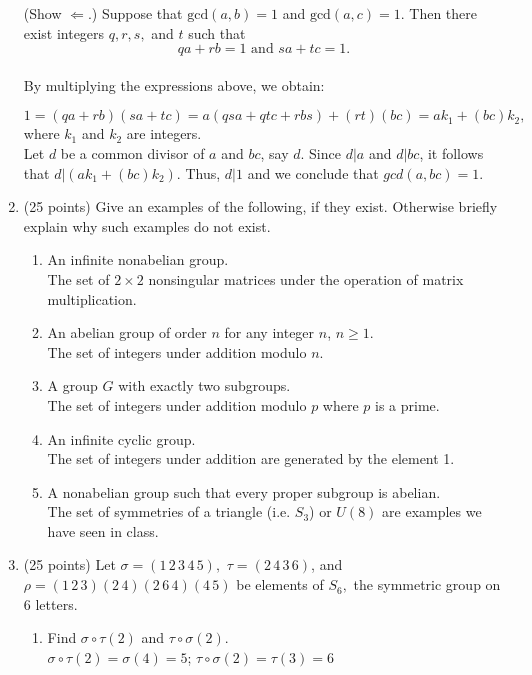 \documentclass[12pt]{article}
\begin{document}
\begin{enumerate}
(Show $\Longleftarrow$.) Suppose that $\text{gcd}(a,b)=1$ and $\text{gcd}(a,c )=1.$ Then there exist integers $q,r,s,$ and $t$ such that 
$$qa+rb=1 \text{  and  } sa+tc=1.$$\\

By multiplying the expressions above, we obtain:

$$1=(qa+rb)(sa+tc)=a(qsa+qtc+rbs)+(rt)(bc)=ak_1+(bc)k_2,$$
where $k_1$ and $k_2$ are integers. \\

Let $d$ be a common divisor of $a$ and $bc$, say $d.$ Since $d|a$ and $d|bc$, it follows that $d|(ak_1+(bc)k_2).$ Thus, $d|1$ and we conclude that $gcd(a,bc)=1.$ 

\vfill
\item (25 points) Give an examples of the following, if they exist. Otherwise briefly explain why such examples do not exist.
	\begin{enumerate}
	\item An infinite nonabelian group.\\
	The set of $2 \times 2$ nonsingular matrices under the operation of matrix multiplication.
	\item An abelian group of order $n$ for any integer $n$, $n\geq 1.$\\
	The set of integers under addition modulo $n$.
	\item A group $G$  with exactly two subgroups.\\
	The set of integers under addition modulo $p$ where $p$ is a prime.
	\item An infinite cyclic group.\\
	The set of integers under addition are generated by the element 1.
	\item A nonabelian group such that every proper subgroup is abelian.\\
	The set of symmetries of a triangle (i.e. $S_3$) or $U(8)$ are examples we have seen in class.
	\end{enumerate}
	
\item (25 points) Let $\sigma=(1 \, 2 \, 3 \, 4 \, 5 ),$  $\tau = (2 \, 4 \, 3 \, 6)$, and $\rho=(1 \, 2 \, 3 )(2 \,4) (2 \, 6 \, 4) (4 \, 5)$ be elements of $S_6,$ the symmetric group on 6 letters.
	\begin{enumerate}
	\item Find $\sigma \circ \tau (2)$ and $\tau \circ \sigma (2).$\\
	
	$\sigma \circ \tau (2)=\sigma(4)=5$; \quad $\tau \circ \sigma (2)=\tau(3)=6$


\end{enumerate}
\end{enumerate}
\end{document}
